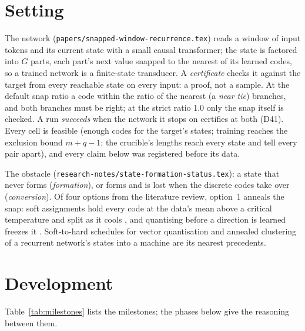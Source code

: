 \documentclass[11pt]{article}
\begin{document}
\section{Setting}

The network (\texttt{papers/snapped-window-recurrence.tex}) reads a window of input tokens and its current
state with a small causal transformer; the state is factored into $G$ parts, each part's next value
snapped to the nearest of its learned codes, so a trained network is a finite-state transducer. A
\emph{certificate} checks it against the target from every reachable state on every input: a proof,
not a sample. At the default snap ratio a code within the ratio of the nearest (a \emph{near tie})
branches, and both branches must be right; at the strict ratio 1.0 only the snap itself is checked.
A run \emph{succeeds} when the network it stops on certifies at both (D41). Every cell is feasible
(enough codes for the target's states; training reaches the exclusion bound $m + q - 1$; the
crucible's lengths reach every state and tell every pair apart), and every claim below was
registered before its data.

The obstacle (\texttt{research-notes/state-formation-status.tex}): a state that never forms (\emph{formation}), or
forms and is lost when the discrete codes take over (\emph{conversion}). Of four options from the
literature review, option~1 anneals the snap: soft assignments hold every code at the data's mean
above a critical temperature and split as it cools
\citep{rose-1998-deterministic-annealing-clustering}, and quantising before a direction is learned
freezes it \citep{zhao-2026-continuous-first-discrete-later-vq-vae}. Soft-to-hard schedules for
vector quantisation \citep{agustsson-2017-soft-to-hard-vector-quantization} and annealed clustering
of a recurrent network's states into a machine
\citep{das-1993-unified-gradient-clustering-fsm-induction} are its nearest precedents.

\section{Development}

Table~\ref{tab:milestones} lists the milestones; the phases below give the reasoning between them.
\end{document}
